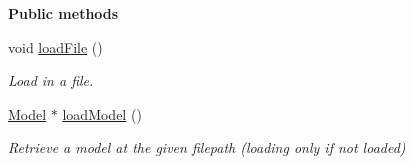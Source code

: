 \begin{Indent}\textbf{ Public methods}\par
\begin{DoxyCompactItemize}
\item 
\mbox{\label{classrev_1_1_model_reader_a647a4f5cef7c0709e703e07c2ba904c1}} 
void \mbox{\hyperlink{classrev_1_1_model_reader_a647a4f5cef7c0709e703e07c2ba904c1}{load\+File}} ()
\begin{DoxyCompactList}\small\item\em Load in a file. \end{DoxyCompactList}\item 
\mbox{\label{classrev_1_1_model_reader_a32ea774167c767d30337e4d347776299}} 
\mbox{\hyperlink{classrev_1_1_model}{Model}} $\ast$ \mbox{\hyperlink{classrev_1_1_model_reader_a32ea774167c767d30337e4d347776299}{load\+Model}} ()
\begin{DoxyCompactList}\small\item\em Retrieve a model at the given filepath (loading only if not loaded) \end{DoxyCompactList}\end{DoxyCompactItemize}
\end{Indent}
